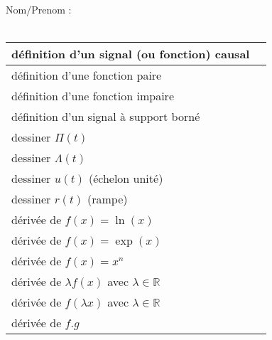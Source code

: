\documentclass{article}
\begin{document}
Nom/Prenom : 
\\
\\

\begin{tabular}{|p{4cm}|p{12cm}|}
\hline définition d'un signal (ou fonction) causal &  \\
\hline définition d'une fonction paire             &  \\
\hline définition d'une fonction impaire           &  \\
\hline définition d'un signal à support borné      &  \\
\hline dessiner $\Pi(t)$                           &  \\
\hline dessiner $\Lambda(t)$                       &  \\
\hline dessiner $u(t)$ (échelon unité)             &  \\
\hline dessiner $r(t)$ (rampe)             &  \\
\hline dérivée de $f(x) = \ln(x)$                  &  \\
\hline dérivée de $f(x) = \exp(x)$                 &  \\
\hline dérivée de $f(x) = x^n$                     &  \\
\hline dérivée de $\lambda f(x)$ avec $\lambda \in \mathbb{R}$  & \\
\hline dérivée de $f(\lambda x)$ avec $\lambda \in \mathbb{R}$ & \\
\hline dérivée de $f.g$  & \\

\hline
\end{tabular}
\end{document}
